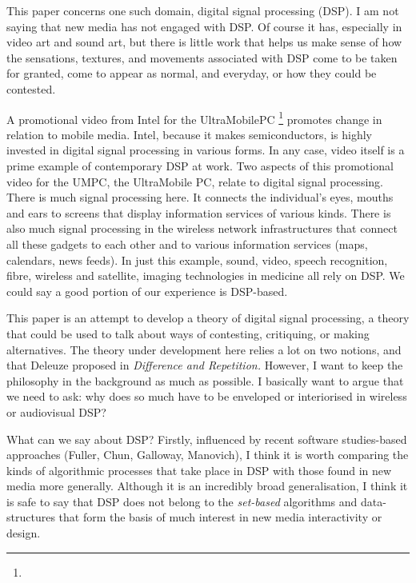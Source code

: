 This paper concerns one such domain, digital signal processing (DSP). I am not saying that new media has not engaged with DSP. Of course it
has, especially in video art and sound art, but there is little work
that helps us make sense of how the sensations, textures, and movements
associated with DSP come to be taken for granted, come to appear as
normal, and everyday, or how they could be contested. 


A promotional video from Intel for the UltraMobilePC \footnote{}
promotes change in relation to mobile media. Intel, because it makes semiconductors, is highly invested in digital signal processing in
various forms. In any case, video itself is a prime example of
contemporary DSP at work. Two aspects of this promotional video for the
UMPC, the UltraMobile PC, relate to digital signal processing. There is
much signal processing here. It connects the
individual's eyes, mouths and ears to screens that
display information services of various kinds. There is also much
signal processing in the wireless network infrastructures that connect
all these gadgets to each other and to various information services
(maps, calendars, news feeds). In just this example, sound, video,
speech recognition, fibre, wireless and satellite, imaging technologies
in medicine all rely on DSP. We could say a good portion of our
experience is DSP{}-based.

This paper is an attempt to develop a theory of digital signal
processing, a theory that could be used to talk about ways of
contesting, critiquing, or making alternatives. The theory under
development here relies a lot on two notions,  and
 that Deleuze proposed in {\em Difference and
Repetition.} However, I want to keep the philosophy in the background
as much as possible. I basically want to argue that we need to ask: why
does so much have to be enveloped or interiorised in wireless or
audiovisual DSP? 


What can we say about DSP? Firstly, influenced by recent software
studies{}-based approaches (Fuller, Chun, Galloway, Manovich), I think
it is worth comparing the kinds of algorithmic processes that take
place in DSP with those found in new media more generally. Although it
is an incredibly broad generalisation, I think it is safe to say that
DSP does not belong to the {\em set{}-based} algorithms and
data{}-structures that form the basis of much interest in new media
interactivity or design.

